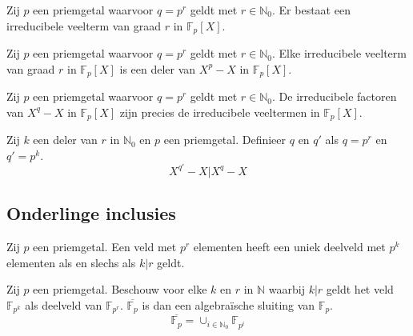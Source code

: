 \documentclass[main.tex]{subfiles}
\begin{document}
\begin{st}
  Zij $p$ een priemgetal waarvoor $q=p^{r}$ geldt met $r\in \mathbb{N}_{0}$.
  Er bestaat een irreducibele veelterm van graad $r$ in $\mathbb{F}_{p}[X]$.
\end{st}

\begin{st}
  Zij $p$ een priemgetal waarvoor $q=p^{r}$ geldt met $r\in \mathbb{N}_{0}$.
  Elke irreducibele veelterm van graad $r$ in $\mathbb{F}_{p}[X]$ is een deler van $X^{p}-X$ in $\mathbb{F}_{p}[X]$.
\end{st}

\begin{st}
  Zij $p$ een priemgetal waarvoor $q=p^{r}$ geldt met $r\in \mathbb{N}_{0}$.
  De irreducibele factoren van $X^{q}-X$ in $\mathbb{F}_{p}[X]$ zijn precies de irreducibele veeltermen in $\mathbb{F}_{p}[X]$.
\end{st}

\begin{lem}
  Zij $k$ een deler van $r$ in $\mathbb{N}_{0}$ en $p$ een priemgetal.
  Definieer $q$ en $q'$ als $q=p^{r}$ en $q'=p^{k}$.
  \[ X^{q'}-X | X^{q}-X \]
\end{lem}


\subsection{Onderlinge inclusies}
\label{sec:onderlinge-inclusies}

\begin{st}
  Zij $p$ een priemgetal.
  Een veld met $p^{r}$ elementen heeft een uniek deelveld met $p^{k}$ elementen als en slechs als $k|r$ geldt.
\end{st}

\begin{pr}
  Zij $p$ een priemgetal.
  Beschouw voor elke $k$ en $r$ in $\mathbb{N}$ waarbij $k|r$ geldt het veld $\mathbb{F}_{p^{k}}$ als deelveld van $\mathbb{F}_{p^{r}}$.
  $\overline{\mathbb{F}_{p}}$ is dan een algebra\"ische sluiting van $\mathbb{F}_{p}$.
  \[ \overline{\mathbb{F}_{p}} = \cup_{i\in \mathbb{N}_{0}}\mathbb{F}_{p^{i}} \]
\end{pr}
\end{document}
